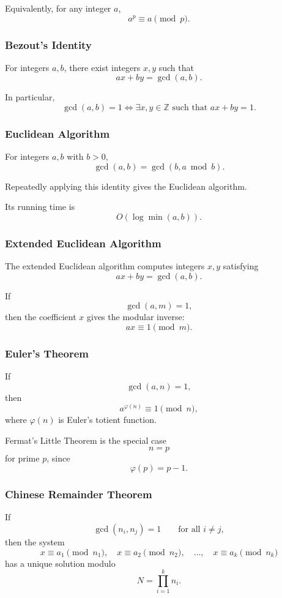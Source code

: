 \documentclass[11pt]{article}
\begin{document}
Equivalently, for any integer $a$,
\[
a^p\equiv a\pmod p.
\]

\subsubsection{Bezout's Identity}

For integers $a,b$, there exist integers $x,y$ such that
\[
ax+by=\gcd(a,b).
\]

In particular,
\[
\gcd(a,b)=1
\iff
\exists x,y\in\mathbb Z
\text{ such that } ax+by=1.
\]

\subsubsection{Euclidean Algorithm}

For integers $a,b$ with $b>0$,
\[
\gcd(a,b)=\gcd(b,a\bmod b).
\]

Repeatedly applying this identity gives the Euclidean algorithm.

Its running time is
\[
O(\log\min(a,b)).
\]

\subsubsection{Extended Euclidean Algorithm}

The extended Euclidean algorithm computes integers $x,y$ satisfying
\[
ax+by=\gcd(a,b).
\]

If
\[
\gcd(a,m)=1,
\]
then the coefficient $x$ gives the modular inverse:
\[
ax\equiv 1\pmod m.
\]

\subsubsection{Euler's Theorem}

If
\[
\gcd(a,n)=1,
\]
then
\[
a^{\varphi(n)}\equiv 1\pmod n,
\]
where $\varphi(n)$ is Euler's totient function.

Fermat's Little Theorem is the special case
\[
n=p
\]
for prime $p$, since
\[
\varphi(p)=p-1.
\]

\subsubsection{Chinese Remainder Theorem}

If
\[
\gcd(n_i,n_j)=1
\qquad\text{for all }i\neq j,
\]
then the system
\[
x\equiv a_1\pmod{n_1},
\quad
x\equiv a_2\pmod{n_2},
\quad\ldots,\quad
x\equiv a_k\pmod{n_k}
\]
has a unique solution modulo
\[
N=\prod_{i=1}^k n_i.
\]
\end{document}
